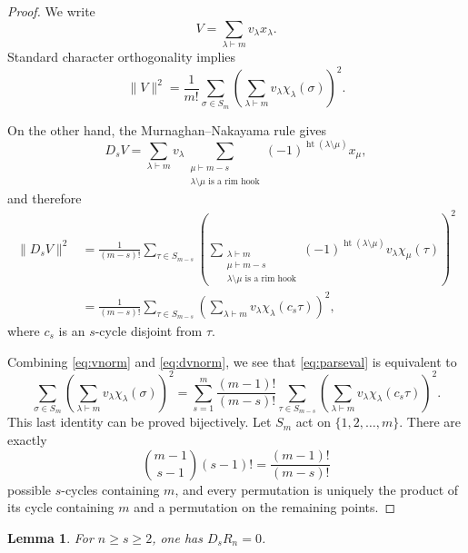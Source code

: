 \documentclass[a4paper,draft]{amsart}
\newtheorem{lemma}{Lemma}
\DeclareMathOperator{\rht}{ht}
\begin{document}
\begin{proof}
We write
\[
V=\sum_{\lambda\vdash m}v_\lambda x_{\lambda}.
\]
Standard character orthogonality implies
\begin{equation}\label{eq:vnorm}
\|V\|^2=\frac{1}{m!}\sum_{\sigma\in S_m}\left(\sum_{\lambda\vdash m}v_\lambda\chi_{\lambda}(\sigma)\right)^2.
\end{equation}

On the other hand, the Murnaghan--Nakayama rule gives
\begin{equation*}
    D_sV=\sum_{\lambda\vdash m}v_\lambda\sum_{\substack{\mu\vdash m-s\\
\lambda\setminus\mu\text{ is a rim hook}}}
(-1)^{\rht(\lambda\setminus\mu)}x_\mu,
\end{equation*}
and therefore
\begin{align}
    \|D_sV\|^2
    &=\frac{1}{(m-s)!}\sum_{\tau\in S_{m-s}}
      \left(\sum_{\substack{\lambda\vdash m\\ \mu\vdash m-s\\
      \lambda\setminus\mu\text{ is a rim hook}}}
      (-1)^{\rht(\lambda\setminus\mu)}v_\lambda\chi_\mu(\tau)\right)^2\nonumber\\
    &=\frac{1}{(m-s)!}\sum_{\tau\in S_{m-s}}
      \left(\sum_{\lambda\vdash m}v_\lambda\chi_\lambda(c_s\tau)\right)^2,
      \label{eq:dvnorm}
\end{align}
where $c_s$ is an $s$-cycle disjoint from $\tau$.

Combining \eqref{eq:vnorm} and \eqref{eq:dvnorm}, we see that
\eqref{eq:parseval} is equivalent to
\begin{equation*}
    \sum_{\sigma\in S_m}\left(\sum_{\lambda\vdash m}v_\lambda\chi_{\lambda}(\sigma)\right)^2
    =\sum_{s=1}^{m}\frac{(m-1)!}{(m-s)!}\sum_{\tau\in S_{m-s}}
      \left(\sum_{\lambda\vdash m}v_\lambda\chi_\lambda(c_s\tau)\right)^2.
\end{equation*}
This last identity can be proved bijectively.  Let $S_m$ act on
$\{1,2,\dots,m\}$.  There are exactly
\[
 \binom{m-1}{s-1}(s-1)! = \frac{(m-1)!}{(m-s)!}
\]
possible $s$-cycles containing $m$, and every permutation is uniquely
the product of its cycle containing $m$ and a permutation on the
remaining points.
\end{proof}


\begin{lemma}\label{lem:regular}
For $n\geq s\geq2$, one has $D_sR_n=0$.
\end{lemma}
\end{document}
